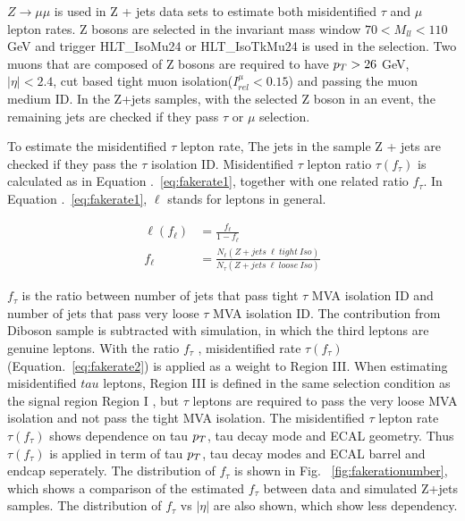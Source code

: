 $Z\rightarrow\mu\mu$ is used in Z + jets data sets to estimate both misidentified $\tau$ and $\mu$ lepton rates. Z bosons are selected in the invariant mass window $70<M_{ll}<110$ GeV and trigger HLT\_IsoMu24 or HLT\_IsoTkMu24 is used in the selection. Two muons that are composed of Z bosons are required to have $p_{T}>26$ GeV, $|\eta|<2.4$, cut based tight muon isolation($I^{\mu}_{rel}<0.15$) and passing the muon medium ID. In the Z+jets samples, with the selected Z boson in an event, the remaining jets are checked if they pass $\tau$ or $\mu$ selection.

To estimate the misidentified $\tau$ lepton rate, The jets in the sample Z + jets are checked if they pass the $\tau$ isolation ID. Misidentified $\tau$ lepton ratio $\tau(f_{\tau})$ is calculated as in Equation .~\ref{eq:fakerate1}, together with one related ratio $f_{\tau}$. In Equation .~\ref{eq:fakerate1}, $\ell$ stands for leptons in general.

\begin{align} 
\ell(f_{\ell})&=\frac{f_{\ell}}{1-f_{\ell}} \label{eq:fakerate1}\\
f_{\ell}&=\frac{N_{\ell}(Z+jets\ \ell \ tight\ Iso)}{N_{\tau}(Z+jets\ \ell \ loose\ Iso)} \label{eq:fakerate2}
\end{align}

$f_{\tau}$ is the ratio between number of jets that pass tight $\tau$ MVA isolation ID and number of jets that pass very loose $\tau$ MVA isolation ID. The contribution from Diboson sample is subtracted with simulation, in which the third leptons are genuine leptons. With the ratio $f_{\tau}$ , misidentified rate $\tau(f_{\tau})$(Equation.~\ref{eq:fakerate2}) is applied as a weight to Region III. When estimating misidentified $tau$ leptons, Region III is defined in the same selection condition as the signal region Region I , but  $\tau$ leptons are required to pass the very loose MVA isolation and not pass the tight MVA isolation. The misidentified $\tau$ lepton rate $\tau(f_{\tau})$ shows dependence on tau $p_{T}$, tau decay mode and ECAL geometry. Thus $\tau(f_{\tau})$ is applied in term of tau $p_{T}$, tau decay modes and ECAL barrel and endcap seperately. The distribution of $f_{\tau}$ is shown in Fig.~ \ref{fig:fakerationumber}, which shows a comparison of the estimated $f_{\tau}$ between data and simulated Z+jets samples. The distribution of $f_{\tau}$ vs $|\eta|$ are also shown, which show less dependency. 

